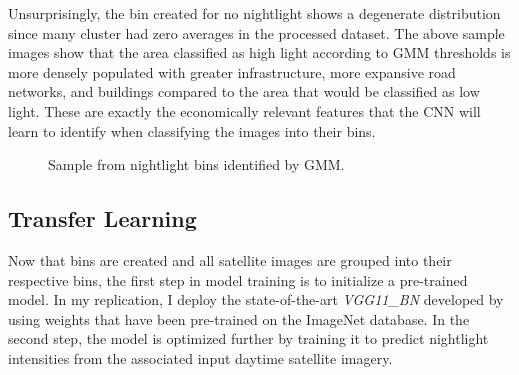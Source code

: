 \documentclass[11pt, a4paper, leqno]{article}
\begin{document}
 Unsurprisingly, the bin created for no nightlight shows a degenerate distribution since many cluster had zero averages in the processed dataset. The above sample images show that the area classified as high light according to GMM thresholds is more densely populated with greater infrastructure, more expansive road networks, and buildings compared to the area that would be classified as low light. These are exactly the economically relevant features that the CNN will learn to identify when classifying the images into their bins. 

\begin{figure}%
    \centering
    \qquad
    \caption{Sample from nightlight bins identified by GMM.}%
    \label{fig:example}%
\end{figure}

\subsection{Transfer Learning}

 Now that bins are created and all satellite images are grouped into their respective bins, the first step in model training is to initialize a pre-trained model. In my replication, I deploy the state-of-the-art \textit{VGG11\_BN} developed by \citet{simonyan2014very} using weights that have been pre-trained on the ImageNet database. In the second step, the model is optimized further by training it to predict nightlight intensities from the associated input daytime satellite imagery.
\end{document}
